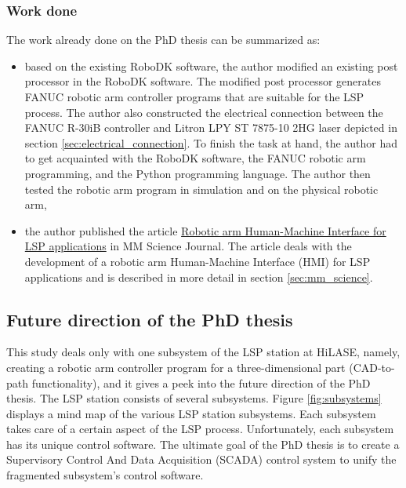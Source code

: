 \subsubsection*{Work done}

The work already done on the PhD thesis can be summarized as:

\begin{itemize}
 


    \item based on the existing RoboDK software, the author modified an existing post processor in the RoboDK software. The modified post processor generates FANUC robotic arm controller programs that are suitable for the LSP process. The author also constructed the electrical connection between the FANUC R-30iB controller and Litron LPY ST 7875-10 2HG laser depicted in section \hyperref[sec:electrical_connection]{\ref{sec:electrical_connection}}. To finish the task at hand, the author had to get acquainted with the RoboDK software, the FANUC robotic arm programming, and the Python programming language. The author then tested the robotic arm program in simulation and on the physical robotic arm,

    \item the author published the article \href{https://www.mmscience.eu/journal/issues/december-2019/articles/robotic-arm-human-machine-interface-for-laser-shock-peening-applications}{Robotic arm Human-Machine Interface for LSP applications} in MM Science Journal. The article deals with the development of a robotic arm Human-Machine Interface (HMI) for LSP applications and is described in more detail in section \hyperref[sec:mm_science]{\ref{sec:mm_science}}.

\end{itemize}
    
    



\subsection{Future direction of the PhD thesis}

This study deals only with one subsystem of the LSP station at HiLASE, namely, creating a robotic arm controller program for a three-dimensional part (CAD-to-path functionality), and it gives a peek into the future direction of the PhD thesis. The LSP station consists of several subsystems. Figure \ref{fig:subsystems} displays a mind map of the various LSP station subsystems. Each subsystem takes care of a certain aspect of the LSP process. Unfortunately, each subsystem has its unique control software. The ultimate goal of the PhD thesis is to create a  Supervisory Control And Data Acquisition (SCADA) control system to unify the fragmented subsystem's control software. 

